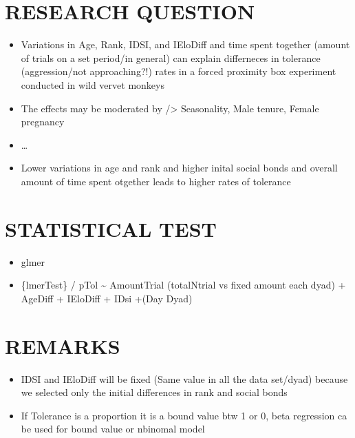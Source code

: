 \documentclass[
]{article}
\providecommand{\tightlist}{%
  \setlength{\itemsep}{0pt}\setlength{\parskip}{0pt}}
\begin{document}
\hypertarget{research-question}{%
\section{RESEARCH QUESTION}\label{research-question}}

\begin{itemize}
\item
  Variations in Age, Rank, IDSI, and IEloDiff and time spent together
  (amount of trials on a set period/in general) can explain differneces
  in tolerance (aggression/not approaching?!) rates in a forced
  proximity box experiment conducted in wild vervet monkeys
\item
  The effects may be moderated by /\textgreater{} Seasonality, Male
  tenure, Female pregnancy
\item
  \ldots{}
\item
  Lower variations in age and rank and higher inital social bonds and
  overall amount of time spent otgether leads to higher rates of
  tolerance
\end{itemize}

\hypertarget{statistical-test}{%
\section{STATISTICAL TEST}\label{statistical-test}}

\begin{itemize}
\tightlist
\item
  glmer
\item
  \{lmerTest\} / pTol \textasciitilde{} AmountTrial (totalNtrial vs
  fixed amount each dyad) + AgeDiff + IEloDiff + IDsi +(Day\textbar{}
  Dyad)
\end{itemize}

\hypertarget{remarks}{%
\section{REMARKS}\label{remarks}}

\begin{itemize}
\tightlist
\item
  IDSI and IEloDiff will be fixed (Same value in all the data set/dyad)
  because we selected only the initial differences in rank and social
  bonds
\item
  If Tolerance is a proportion it is a bound value btw 1 or 0, beta
  regression ca be used for bound value or nbinomal model
\end{itemize}
\end{document}
